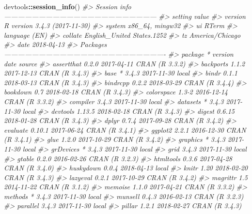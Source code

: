 \documentclass [11pt, proquest] {uwthesis}[2015/03/03]
\newenvironment{Shaded}{}{}
\newcommand{\KeywordTok}[1]{\textcolor[rgb]{0.00,0.44,0.13}{\textbf{{#1}}}}
\newcommand{\CommentTok}[1]{\textcolor[rgb]{0.38,0.63,0.69}{\textit{{#1}}}}
\newcommand{\NormalTok}[1]{{#1}}
\newcommand{\OperatorTok}[1]{\textcolor[rgb]{0.00,0.44,0.13}{\textbf{{#1}}}}
\begin{document}
\begin{Shaded}
\begin{Highlighting}[]
\NormalTok{devtools}\OperatorTok{::}\KeywordTok{session_info}\NormalTok{()}
\CommentTok{#> Session info ------------------------------------------------------------------}
\CommentTok{#>  setting  value                       }
\CommentTok{#>  version  R version 3.4.3 (2017-11-30)}
\CommentTok{#>  system   x86_64, mingw32             }
\CommentTok{#>  ui       RTerm                       }
\CommentTok{#>  language (EN)                        }
\CommentTok{#>  collate  English_United States.1252  }
\CommentTok{#>  tz       America/Chicago             }
\CommentTok{#>  date     2018-04-13}
\CommentTok{#> Packages ----------------------------------------------------------------------}
\CommentTok{#>  package    * version date       source        }
\CommentTok{#>  assertthat   0.2.0   2017-04-11 CRAN (R 3.3.2)}
\CommentTok{#>  backports    1.1.2   2017-12-13 CRAN (R 3.4.3)}
\CommentTok{#>  base       * 3.4.3   2017-11-30 local         }
\CommentTok{#>  bindr        0.1.1   2018-03-13 CRAN (R 3.4.3)}
\CommentTok{#>  bindrcpp     0.2.2   2018-03-29 CRAN (R 3.4.4)}
\CommentTok{#>  bookdown     0.7     2018-02-18 CRAN (R 3.4.3)}
\CommentTok{#>  colorspace   1.3-2   2016-12-14 CRAN (R 3.3.2)}
\CommentTok{#>  compiler     3.4.3   2017-11-30 local         }
\CommentTok{#>  datasets   * 3.4.3   2017-11-30 local         }
\CommentTok{#>  devtools     1.13.5  2018-02-18 CRAN (R 3.4.3)}
\CommentTok{#>  digest       0.6.15  2018-01-28 CRAN (R 3.4.3)}
\CommentTok{#>  dplyr        0.7.4   2017-09-28 CRAN (R 3.4.2)}
\CommentTok{#>  evaluate     0.10.1  2017-06-24 CRAN (R 3.4.1)}
\CommentTok{#>  ggplot2      2.2.1   2016-12-30 CRAN (R 3.4.1)}
\CommentTok{#>  glue         1.2.0   2017-10-29 CRAN (R 3.4.2)}
\CommentTok{#>  graphics   * 3.4.3   2017-11-30 local         }
\CommentTok{#>  grDevices  * 3.4.3   2017-11-30 local         }
\CommentTok{#>  grid         3.4.3   2017-11-30 local         }
\CommentTok{#>  gtable       0.2.0   2016-02-26 CRAN (R 3.2.3)}
\CommentTok{#>  htmltools    0.3.6   2017-04-28 CRAN (R 3.4.0)}
\CommentTok{#>  huskydown    0.0.4   2018-04-13 local         }
\CommentTok{#>  knitr        1.20    2018-02-20 CRAN (R 3.4.3)}
\CommentTok{#>  lazyeval     0.2.1   2017-10-29 CRAN (R 3.4.2)}
\CommentTok{#>  magrittr     1.5     2014-11-22 CRAN (R 3.1.2)}
\CommentTok{#>  memoise      1.1.0   2017-04-21 CRAN (R 3.3.2)}
\CommentTok{#>  methods    * 3.4.3   2017-11-30 local         }
\CommentTok{#>  munsell      0.4.3   2016-02-13 CRAN (R 3.2.3)}
\CommentTok{#>  parallel     3.4.3   2017-11-30 local         }
\CommentTok{#>  pillar       1.2.1   2018-02-27 CRAN (R 3.4.3)}

\end{Highlighting}
\end{Shaded}
\end{document}
